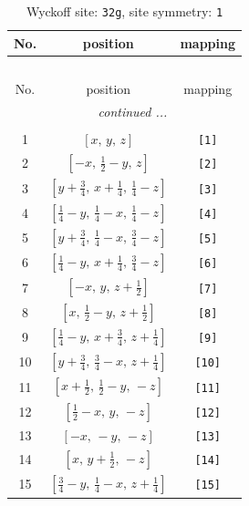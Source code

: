 \documentclass[fleqn,8pt]{jsarticle}
\begin{document}
\renewcommand{\arraystretch}{1.2}
\begin{longtable}{ccc}
\caption{Wyckoff site: {\tt 32g}, site symmetry: {\tt 1}}
 \\
 \hline \hline
No. & position & mapping \\ \hline \endfirsthead

\multicolumn{2}{l}{\tablename\ \thetable{}} \\
 \hline \hline
No. & position & mapping \\ \hline \endhead

 \hline \hline
\multicolumn{2}{r}{\footnotesize\it continued ...} \\ \endfoot

 \hline \hline
\multicolumn{2}{r}{} \\ \endlastfoot

1 & $\left[ x,\, y,\, z \right]$ & {\tt [1]} \\ \hline
2 & $\left[ - x,\, \frac{1}{2} - y,\, z \right]$ & {\tt [2]} \\ \hline
3 & $\left[ y + \frac{3}{4},\, x + \frac{1}{4},\, \frac{1}{4} - z \right]$ & {\tt [3]} \\ \hline
4 & $\left[ \frac{1}{4} - y,\, \frac{1}{4} - x,\, \frac{1}{4} - z \right]$ & {\tt [4]} \\ \hline
5 & $\left[ y + \frac{3}{4},\, \frac{1}{4} - x,\, \frac{3}{4} - z \right]$ & {\tt [5]} \\ \hline
6 & $\left[ \frac{1}{4} - y,\, x + \frac{1}{4},\, \frac{3}{4} - z \right]$ & {\tt [6]} \\ \hline
7 & $\left[ - x,\, y,\, z + \frac{1}{2} \right]$ & {\tt [7]} \\ \hline
8 & $\left[ x,\, \frac{1}{2} - y,\, z + \frac{1}{2} \right]$ & {\tt [8]} \\ \hline
9 & $\left[ \frac{1}{4} - y,\, x + \frac{3}{4},\, z + \frac{1}{4} \right]$ & {\tt [9]} \\ \hline
10 & $\left[ y + \frac{3}{4},\, \frac{3}{4} - x,\, z + \frac{1}{4} \right]$ & {\tt [10]} \\ \hline
11 & $\left[ x + \frac{1}{2},\, \frac{1}{2} - y,\, - z \right]$ & {\tt [11]} \\ \hline
12 & $\left[ \frac{1}{2} - x,\, y,\, - z \right]$ & {\tt [12]} \\ \hline
13 & $\left[ - x,\, - y,\, - z \right]$ & {\tt [13]} \\ \hline
14 & $\left[ x,\, y + \frac{1}{2},\, - z \right]$ & {\tt [14]} \\ \hline
15 & $\left[ \frac{3}{4} - y,\, \frac{1}{4} - x,\, z + \frac{1}{4} \right]$ & {\tt [15]} \\ \hline

\end{longtable}
\end{document}
